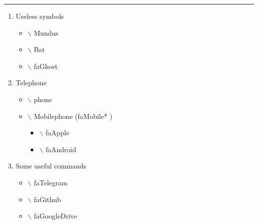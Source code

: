 \documentclass{article}
\begin{document}
\begin{center}\noindent\rule{13cm}{0.4pt}\end{center}


\renewcommand{\theenumi}{\Roman{enumi}}
\begin{enumerate}
	\item Useless symbols
	\begin{itemize}
    	\item[\Mundus] $\backslash$ Mundus
    	\item[\Bat] $\backslash$ Bat
    	\item[\faGhost] $\backslash$ faGhost
	\end{itemize}
    
	\item Telephone\\
	\begin{itemize}
    	\item[\phone] $\backslash$ phone
    	\item[\faMobile*] $\backslash$ Mobilephone (faMobile* )
    	\begin{itemize}
        	\item[\faApple] $\backslash$ faApple
        	\item[\faAndroid] $\backslash$ faAndroid
    	\end{itemize}
	\end{itemize}
    
	\item Some useful commands\\
	\begin{itemize}
    	\item[\faTelegram] $\backslash$ faTelegram
    	\item[\faGithub] $\backslash$ faGithub
    	\item[\faGoogleDrive] $\backslash$ faGoogleDrive
	\end{itemize}
\end{enumerate}
\end{document}
